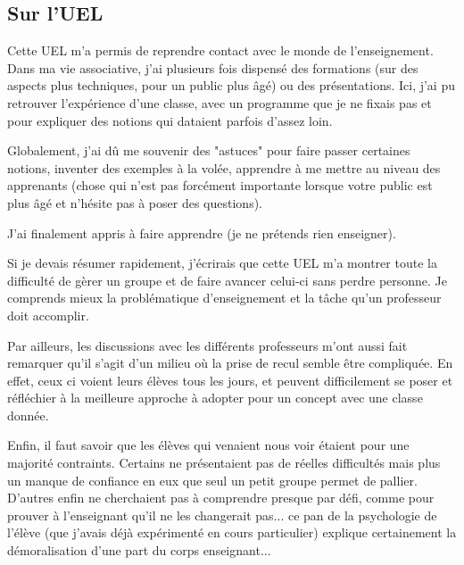 \subsection{Sur l'UEL}

Cette UEL m'a permis de reprendre contact avec le monde de l'enseignement. Dans ma vie associative, j'ai plusieurs fois
dispensé des formations (sur des aspects plus techniques, pour un public plus âgé) ou des présentations. Ici, j'ai pu
retrouver l'expérience d'une classe, avec un programme que je ne fixais pas et pour expliquer des notions qui dataient
parfois d'assez loin.

Globalement, j'ai dû me souvenir des "astuces" pour faire passer certaines notions, inventer des exemples à la volée,
apprendre à me mettre au niveau des apprenants (chose qui n'est pas forcément importante lorsque votre public est plus
âgé et n'hésite pas à poser des questions).

J'ai finalement appris à faire apprendre (je ne prétends rien enseigner).

Si je devais résumer rapidement, j'écrirais que cette UEL m'a montrer toute la difficulté de gèrer un groupe et de faire
avancer celui-ci sans perdre personne. Je comprends mieux la problématique d'enseignement et la tâche qu'un professeur
doit accomplir.

Par ailleurs, les discussions avec les différents professeurs m'ont aussi fait remarquer qu'il s'agit d'un milieu où la
prise de recul semble être compliquée. En effet, ceux ci voient leurs élèves tous les jours, et peuvent difficilement se
poser et réfléchier à la meilleure approche à adopter pour un concept avec une classe donnée.

Enfin, il faut savoir que les élèves qui venaient nous voir étaient pour une majorité contraints. Certains ne
présentaient pas de réelles difficultés mais plus un manque de confiance en eux que seul un petit groupe permet de
pallier. D'autres enfin ne cherchaient pas à comprendre presque par défi, comme pour prouver à l'enseignant qu'il ne les
changerait pas... ce pan de la psychologie de l'élève (que j'avais déjà expérimenté en cours particulier) explique
certainement la démoralisation d'une part du corps enseignant...
